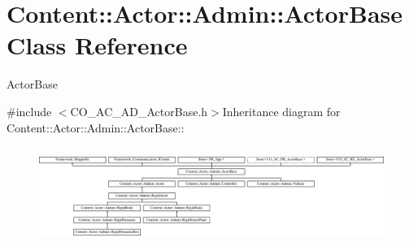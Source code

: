 \hypertarget{classContent_1_1Actor_1_1Admin_1_1ActorBase}{
\section{Content::Actor::Admin::ActorBase Class Reference}
\label{classContent_1_1Actor_1_1Admin_1_1ActorBase}
}


ActorBase  


{\ttfamily \#include $<$CO\_\-AC\_\-AD\_\-ActorBase.h$>$}Inheritance diagram for Content::Actor::Admin::ActorBase::\begin{figure}[H]
\begin{center}
\leavevmode
\includegraphics[height=3.2cm]{classContent_1_1Actor_1_1Admin_1_1ActorBase}
\end{center}
\end{figure}
